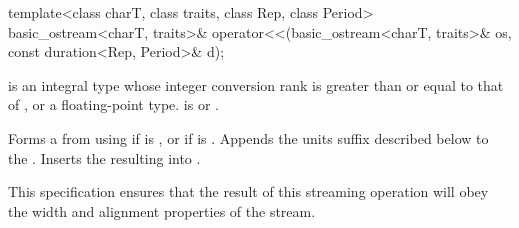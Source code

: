 %
\begin{itemdecl}
template<class charT, class traits, class Rep, class Period>
  basic_ostream<charT, traits>&
    operator<<(basic_ostream<charT, traits>& os, const duration<Rep, Period>& d);
\end{itemdecl}

\begin{itemdescr}
\pnum
\requires {} is an integral type
whose integer conversion rank
is greater than or equal to that of ,
or a floating-point type.
 is  or .

\pnum
\effects
Forms a  from 
using  if  is ,
or  if  is .
Appends the units suffix described below to the .
Inserts the resulting  into .
\begin{note}
This specification ensures that the result of this streaming operation
will obey the width and alignment properties of the stream.
\end{note}


\end{itemdescr}
